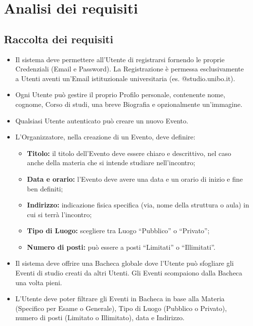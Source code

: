 \documentclass[12pt,a4paper]{report}
\begin{document}
\newpage
\tableofcontents

\newpage
\chapter{Analisi dei requisiti}

\section{Raccolta dei requisiti}
\begin{itemize}[leftmargin=*]
    \item Il sistema deve permettere all'Utente di registrarsi fornendo le proprie Credenziali (Email e Password). La Registrazione è permessa esclusivamente a Utenti aventi un'Email istituzionale universitaria (es. @studio.unibo.it).
    \item Ogni Utente può gestire il proprio Profilo personale, contenente nome, cognome, Corso di studi, una breve Biografia e opzionalmente un'immagine.
    \item Qualsiasi Utente autenticato può creare un nuovo Evento.
    \item L'Organizzatore, nella creazione di un Evento, deve definire:
    \begin{itemize}
        \item \textbf{Titolo:} il titolo dell'Evento deve essere chiaro e descrittivo, nel caso anche della materia che si intende studiare nell'incontro;
        \item \textbf{Data e orario:} l'Evento deve avere una data e un orario di inizio e fine ben definiti;
        \item \textbf{Indirizzo:} indicazione fisica specifica (via, nome della struttura o aula) in cui si terrà l'incontro;
        \item \textbf{Tipo di Luogo:} scegliere tra Luogo ``Pubblico'' o ``Privato'';
        \item \textbf{Numero di posti:} può essere a posti ``Limitati'' o ``Illimitati''.
    \end{itemize}
    \item Il sistema deve offrire una Bacheca globale dove l'Utente può sfogliare gli Eventi di studio creati da altri Utenti. Gli Eventi scompaiono dalla Bacheca una volta pieni.
    \item L'Utente deve poter filtrare gli Eventi in Bacheca in base alla Materia (Specifico per Esame o Generale), Tipo di Luogo (Pubblico o Privato), numero di posti (Limitato o Illimitato), data e Indirizzo.

\end{itemize}
\end{document}
